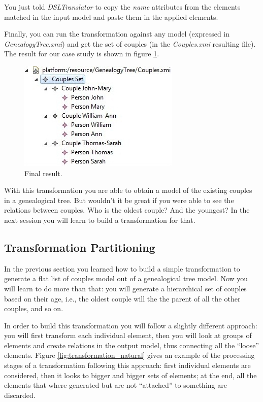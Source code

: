 You just told \emph{DSLTranslator} to copy the \emph{name} attributes from the
elements matched in the input model and paste them in the applied elements.

Finally, you can run the transformation against any model (expressed in
\emph{GenealogyTree.xmi}) and get the set of couples (in the \emph{Couples.xmi}
resulting file). The result for our case study is shown in figure
\ref{fig:first_transformatio_result}.

\begin{figure}[h]
\begin{center}
  \includegraphics[scale=0.7]{imgs/first_transformatio_result.jpg}
  \caption{Final result.}
  \label{fig:first_transformatio_result}
\end{center}
\end{figure}

With this transformation you are able to obtain a model of the existing couples
in a genealogical tree. But wouldn't it be great if you were able to see the
relations between couples. Who is the oldest couple? And the youngest? In the
next session you will learn to build a transformation for that.

\clearpage

\subsection{Transformation Partitioning}

In the previous section you learned how to build a simple transformation to
generate a flat list of couples model out of a genealogical tree model. Now you
will learn to do more than that: you will generate a hierarchical set of couples
based on their age, i.e., the oldest couple will the the parent of all the other
couples, and so on.

In order to build this transformation you will follow a slightly different
approach: you will first transform each individual element, then you will look
at groups of elements and create relations in the output model, thus
connecting all the ``loose'' elements. Figure \ref{fig:transformation_natural}
gives an example of the processing stages of a transformation following this
approach: first individual elements are considered, then it looks to bigger and
bigger sets of elements; at the end, all the elements that where generated but
are not ``attached'' to something are discarded.

